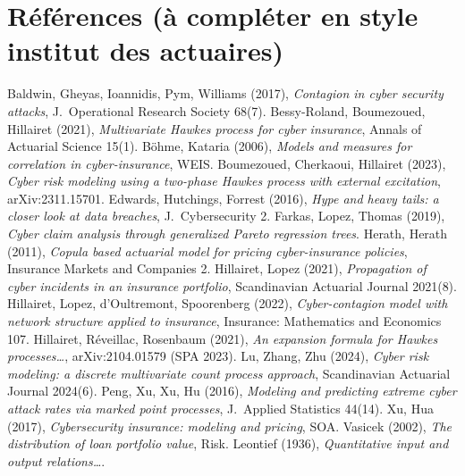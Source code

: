 \documentclass[11pt,a4paper]{article}
\begin{document}
\section*{Références (à compléter en style institut des actuaires)}
\footnotesize
Baldwin, Gheyas, Ioannidis, Pym, Williams (2017), \emph{Contagion in cyber security attacks},
J.\ Operational Research Society 68(7). \quad
Bessy-Roland, Boumezoued, Hillairet (2021), \emph{Multivariate Hawkes process for cyber
insurance}, Annals of Actuarial Science 15(1). \quad
Böhme, Kataria (2006), \emph{Models and measures for correlation in cyber-insurance}, WEIS. \quad
Boumezoued, Cherkaoui, Hillairet (2023), \emph{Cyber risk modeling using a two-phase Hawkes
process with external excitation}, arXiv:2311.15701. \quad
Edwards, Hutchings, Forrest (2016), \emph{Hype and heavy tails: a closer look at data
breaches}, J.\ Cybersecurity 2. \quad
Farkas, Lopez, Thomas (2019), \emph{Cyber claim analysis through generalized Pareto regression
trees}. \quad
Herath, Herath (2011), \emph{Copula based actuarial model for pricing cyber-insurance
policies}, Insurance Markets and Companies 2. \quad
Hillairet, Lopez (2021), \emph{Propagation of cyber incidents in an insurance portfolio},
Scandinavian Actuarial Journal 2021(8). \quad
Hillairet, Lopez, d'Oultremont, Spoorenberg (2022), \emph{Cyber-contagion model with network
structure applied to insurance}, Insurance: Mathematics and Economics 107. \quad
Hillairet, Réveillac, Rosenbaum (2021), \emph{An expansion formula for Hawkes processes\dots},
arXiv:2104.01579 (SPA 2023). \quad
Lu, Zhang, Zhu (2024), \emph{Cyber risk modeling: a discrete multivariate count process
approach}, Scandinavian Actuarial Journal 2024(6). \quad
Peng, Xu, Xu, Hu (2016), \emph{Modeling and predicting extreme cyber attack rates via marked
point processes}, J.\ Applied Statistics 44(14). \quad
Xu, Hua (2017), \emph{Cybersecurity insurance: modeling and pricing}, SOA. \quad
Vasicek (2002), \emph{The distribution of loan portfolio value}, Risk. \quad
Leontief (1936), \emph{Quantitative input and output relations\dots}.
\end{document}
